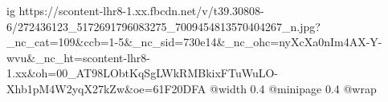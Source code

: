  
 
 
 
 

\ifcmt
  ig https://scontent-lhr8-1.xx.fbcdn.net/v/t39.30808-6/272436123_5172691796083275_7009454813570404267_n.jpg?_nc_cat=109&ccb=1-5&_nc_sid=730e14&_nc_ohc=nyXcXa0nIm4AX-Y-wvu&_nc_ht=scontent-lhr8-1.xx&oh=00_AT98LObtKqSgLWkRMBkixFTuWuLO-Xhb1pM4W2yqX27kZw&oe=61F20DFA
  @width 0.4
  @minipage 0.4
  @wrap \parpic[r]
\fi
